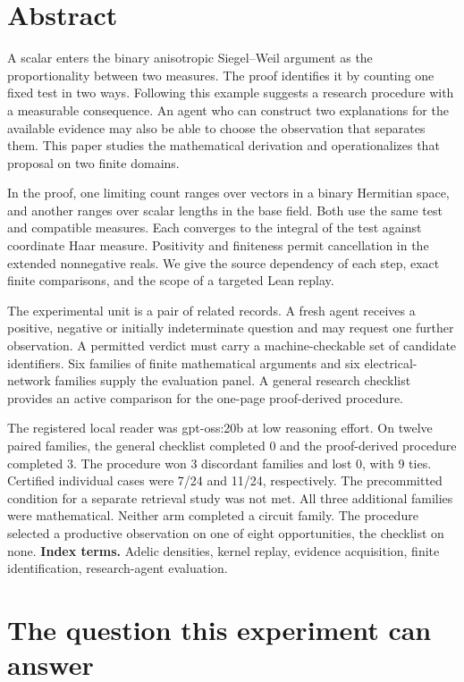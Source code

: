 \documentclass[12pt,letterpaper]{article}
\begin{document}
\section*{Abstract}
A scalar enters the binary anisotropic Siegel--Weil argument as the proportionality between two measures. The proof identifies it by counting one fixed test in two ways. Following this example suggests a research procedure with a measurable consequence. An agent who can construct two explanations for the available evidence may also be able to choose the observation that separates them. This paper studies the mathematical derivation and operationalizes that proposal on two finite domains.
\par
In the proof, one limiting count ranges over vectors in a binary Hermitian space, and another ranges over scalar lengths in the base field. Both use the same test and compatible measures. Each converges to the integral of the test against coordinate Haar measure. Positivity and finiteness permit cancellation in the extended nonnegative reals. We give the source dependency of each step, exact finite comparisons, and the scope of a targeted Lean replay.
\par
The experimental unit is a pair of related records. A fresh agent receives a positive, negative or initially indeterminate question and may request one further observation. A permitted verdict must carry a machine-checkable set of candidate identifiers. Six families of finite mathematical arguments and six electrical-network families supply the evaluation panel. A general research checklist provides an active comparison for the one-page proof-derived procedure.
\par
The registered local reader was gpt-oss:20b at low reasoning effort. On twelve paired families, the general checklist completed 0 and the proof-derived procedure completed 3. The procedure won 3 discordant families and lost 0, with 9 ties. Certified individual cases were 7/24 and 11/24, respectively. The precommitted condition for a separate retrieval study was not met. All three additional families were mathematical. Neither arm completed a circuit family. The procedure selected a productive observation on one of eight opportunities, the checklist on none.
\vfill\noindent\small\textbf{Index terms.} Adelic densities, kernel replay, evidence acquisition, finite identification, research-agent evaluation.
\clearpage\tableofcontents\clearpage{}

\section{The question this experiment can answer}
\end{document}
